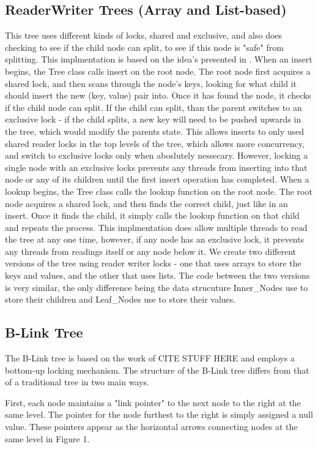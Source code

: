 \documentclass{sig-alternate}
\begin{document}
\subsection{ReaderWriter Trees (Array and List-based)}
This tree uses different kinds of locks, shared and exclusive, and also does checking to see if the child node can split, to see if this node is "safe" from splitting.  This implmentation is based on the idea's presented in \cite{lehman:locking}.
When an insert begins, the Tree class calls insert on the root node.  The root node first acquires a shared lock, and then scans through the node's keys, looking for what child it should insert the new (key, value) pair into.  Once it has found the node, it checks if the child node can split.  If the child can split, than the parent switches to an exclusive lock - if the child splits, a new key will need to be pushed upwards in the tree, which would modify the parents state.  This allows inserts to only used shared reader locks in the top levels of the tree, which allows more concurrency, and switch to exclusive locks only when aboslutely nessecary.  However, locking a single node with an exclusive locks prevents any threads from inserting into that node or any of its children until the first insert operation has completed.
When a lookup begins, the Tree class calls the lookup function on the root node. The root node acquires a shared lock, and then finds the correct child, just like in an insert. Once it finds the child, it simply calls the lookup function on that child and repeats the process.  This implmentation does allow multiple threads to read the tree at any one time, however, if any node has an exclusive lock, it prevents any threads from readings itself or any node below it.
We create two different versions of the tree using reader writer locks - one that uses arrays to store the keys and values, and the other that uses lists.  The code between the two versions is very similar, the only difference being the data strucuture Inner\_Nodes use to store their children and Leaf\_Nodes use to store their values.
\subsection{B-Link Tree}
The B-Link tree is based on the work of CITE STUFF HERE and employs a bottom-up locking mechanism. The structure of the B-Link tree differs from that of a traditional tree in two main ways.

First, each node maintains a "link pointer" to the next node to the right at the same level. The pointer for the node furthest to the right is simply assigned a null value. These pointers appear as the horizontal arrows connecting nodes at the same level in Figure 1.
\end{document}
